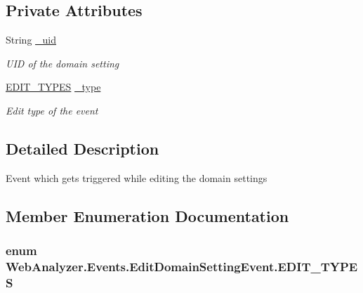 \subsection*{Private Attributes}
\begin{DoxyCompactItemize}
\item 
String \hyperlink{class_web_analyzer_1_1_events_1_1_edit_domain_setting_event_aa086a99df55cd981e1d841edb844ebcc}{\+\_\+uid}
\begin{DoxyCompactList}\small\item\em U\+I\+D of the domain setting \end{DoxyCompactList}\item 
\hyperlink{class_web_analyzer_1_1_events_1_1_edit_domain_setting_event_a1a22be020f4b06370ab3a64893272b44}{E\+D\+I\+T\+\_\+\+T\+Y\+P\+E\+S} \hyperlink{class_web_analyzer_1_1_events_1_1_edit_domain_setting_event_afe924ff1d33b89646a5e3de2110a0f14}{\+\_\+type}
\begin{DoxyCompactList}\small\item\em Edit type of the event \end{DoxyCompactList}\end{DoxyCompactItemize}


\subsection{Detailed Description}
Event which gets triggered while editing the domain settings 



\subsection{Member Enumeration Documentation}
\hypertarget{class_web_analyzer_1_1_events_1_1_edit_domain_setting_event_a1a22be020f4b06370ab3a64893272b44}{}
\subsubsection[{E\+D\+I\+T\+\_\+\+T\+Y\+P\+E\+S}]{\setlength{\rightskip}{0pt plus 5cm}enum {\bf Web\+Analyzer.\+Events.\+Edit\+Domain\+Setting\+Event.\+E\+D\+I\+T\+\_\+\+T\+Y\+P\+E\+S}\hspace{0.3cm}{\ttfamily [strong]}}\label{class_web_analyzer_1_1_events_1_1_edit_domain_setting_event_a1a22be020f4b06370ab3a64893272b44}


